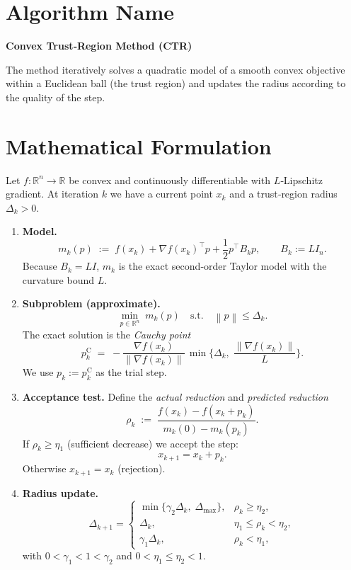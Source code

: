 \documentclass{article}
\newcommand{\norm}[1]{\left\lVert#1\right\rVert}
\begin{document}
\section*{Algorithm Name}
\textbf{Convex Trust‑Region Method (CTR)}  

The method iteratively solves a quadratic model of a smooth convex objective within a Euclidean ball (the trust region) and updates the radius according to the quality of the step.

\section*{Mathematical Formulation}
Let $f:\mathbb{R}^n\rightarrow\mathbb{R}$ be convex and continuously differentiable with $L$‑Lipschitz gradient.  
At iteration $k$ we have a current point $x_k$ and a trust‑region radius $\Delta_k>0$.

\begin{enumerate}[label=\arabic*)]
\item \textbf{Model.}  
\[
m_k(p)\;:=\;f(x_k)+\nabla f(x_k)^{\!\top}p+\frac{1}{2}p^{\!\top}B_k p,
\qquad B_k:=L I_n .
\]
Because $B_k=L I$, $m_k$ is the exact second‑order Taylor model with the curvature bound $L$.

\item \textbf{Subproblem (approximate).}  
\[
\min_{p\in\mathbb{R}^n}\; m_k(p)\quad\text{s.t.}\quad \norm{p}\le \Delta_k .
\]
The exact solution is the \emph{Cauchy point}
\[
p_k^{\text{C}} \;=\; -\frac{\nabla f(x_k)}{\norm{\nabla f(x_k)}}\,
\min\!\Big\{ \Delta_k,\;\frac{\norm{\nabla f(x_k)}}{L}\Big\}.
\]
We use $p_k:=p_k^{\text{C}}$ as the trial step.

\item \textbf{Acceptance test.}  
Define the \emph{actual reduction} and \emph{predicted reduction}
\[
\rho_k \;:=\; 
\frac{f(x_k)-f(x_k+p_k)}{m_k(0)-m_k(p_k)} .
\]
If $\rho_k\ge \eta_1$ (sufficient decrease) we accept the step:
\[
x_{k+1}=x_k+p_k .
\]
Otherwise $x_{k+1}=x_k$ (rejection).

\item \textbf{Radius update.}
\[
\Delta_{k+1}= 
\begin{cases}
\min\{\gamma_2\Delta_k,\;\Delta_{\max}\}, & \rho_k\ge \eta_2,\\[4pt]
\Delta_k,                                 & \eta_1\le\rho_k<\eta_2,\\[4pt]
\gamma_1\Delta_k,                         & \rho_k<\eta_1,
\end{cases}
\]
with $0<\gamma_1<1<\gamma_2$ and $0<\eta_1\le\eta_2<1$.

\end{enumerate}
\end{document}
